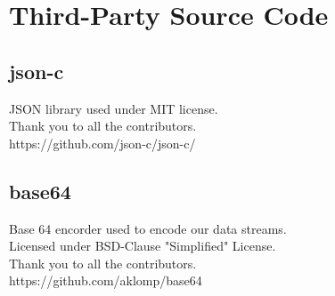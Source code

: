 \documentclass{article}
\begin{document}
\section{Third-Party Source Code}
\subsection{json-c}
JSON library used under MIT license.\\
Thank you to all the contributors.\\
https://github.com/json-c/json-c/\\
\subsection{base64}
Base 64 encorder used to encode our data streams.\\
Licensed under BSD-Clause "Simplified" License.\\
Thank you to all the contributors.\\
https://github.com/aklomp/base64\\
\end{document}
